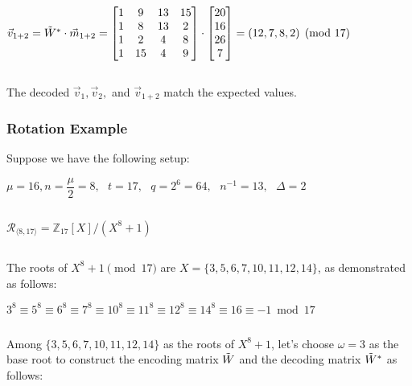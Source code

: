 $\vec{v}_{1+2} = \tilde{W}^* \cdot \vec{m}_{1+2} = \begin{bmatrix}
1 & 9 & 13 & 15\\
1 & 8 & 13 & 2\\
1 & 2 & 4 & 8\\
1 & 15 & 4 & 9\\
\end{bmatrix} \cdot \begin{bmatrix}20\\16\\26\\7\end{bmatrix} = (12, 7, 8, 2) \pmod{17}$

$ $

The decoded $\vec{v}_1, \vec{v}_2,$ and $\vec{v}_{1+2}$ match the expected values.  




\subsubsection{Rotation Example}
\label{subsubsec:bfv-rotation-ex}

Suppose we have the following setup: 

$\mu = 16, n = \dfrac{\mu}{2} = 8, \text{ } t = 17, \text{ } q = 2^6 = 64, \text{ } n^{-1} = 13, \text{ } \Delta = 2$

$ $

$\mathcal{R}_{\langle 8, 17 \rangle} = \mathbb{Z}_{17}[X] / (X^8 + 1)$

$ $

The roots of $X^8 + 1 \pmod{17}$ are $X = \{3, 5, 6, 7, 10, 11, 12, 14\}$, as demonstrated as follows:

$3^8 \equiv 5^8 \equiv 6^8 \equiv 7^8 \equiv 10^8 \equiv 11^8 \equiv 12^8 \equiv 14^8 \equiv 16 \equiv -1 \bmod{17}$


$ $

Among $\{3, 5, 6, 7, 10, 11, 12, 14\}$ as the roots of $X^8 + 1$, let's choose $\omega = 3$ as the base root to construct the encoding matrix $\tilde{W}$ and the decoding matrix $\tilde{W}^*$ as follows: 


